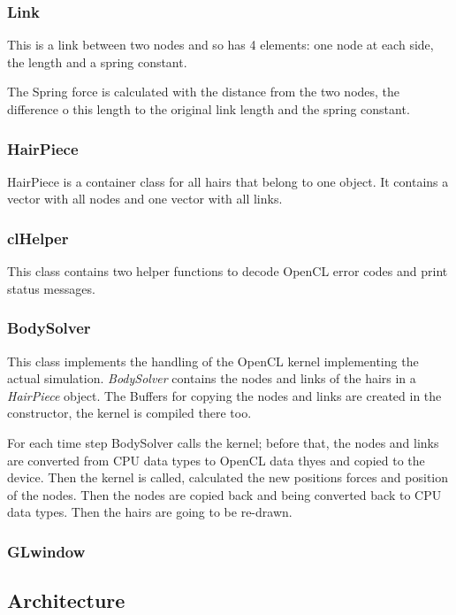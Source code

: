 \documentclass[11pt,a4paper]{scrartcl}
\begin{document}
\subsubsection{Link}
This is a link between two nodes and so has 4 elements: one node at each side, the length and a spring constant.

The Spring force is calculated with the distance from the two nodes, the difference o this length to the original link length and the spring constant.

\subsubsection{HairPiece}
HairPiece is a container class for all hairs that belong to one object. It contains a vector with all nodes and one vector with all links.

\subsubsection{clHelper}
This class contains two helper functions to decode OpenCL error codes and print status messages.

\subsubsection{BodySolver}
This class implements the handling of the OpenCL kernel implementing the actual simulation. \textit{BodySolver} contains the nodes and links of the hairs in a \textit{HairPiece} object. The Buffers for copying the nodes and links are created in the constructor, the kernel is compiled there too.

For each time step BodySolver calls the kernel; before that, the nodes and links are converted from CPU data types to OpenCL data thyes and copied to the device. Then the kernel is called, calculated the new positions forces and position of the nodes. Then the nodes are copied back and being converted back to CPU data types. Then the hairs are going to be re-drawn.

\subsubsection{GLwindow}



\subsection{Architecture}
\end{document}
